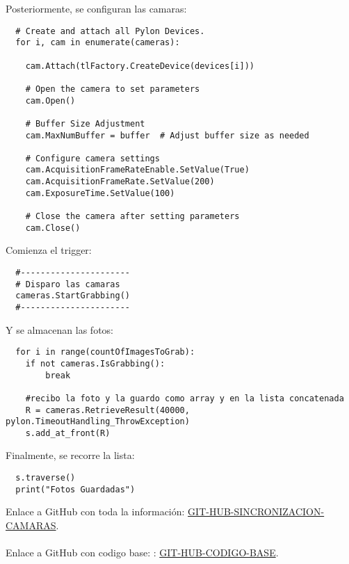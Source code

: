 \documentclass{article}
\begin{document}
Posteriormente, se configuran las camaras:

\begin{lstlisting}
  # Create and attach all Pylon Devices.
  for i, cam in enumerate(cameras):
      
    cam.Attach(tlFactory.CreateDevice(devices[i]))

    # Open the camera to set parameters
    cam.Open()

    # Buffer Size Adjustment
    cam.MaxNumBuffer = buffer  # Adjust buffer size as needed
    
    # Configure camera settings
    cam.AcquisitionFrameRateEnable.SetValue(True)
    cam.AcquisitionFrameRate.SetValue(200)
    cam.ExposureTime.SetValue(100) 

    # Close the camera after setting parameters
    cam.Close()
\end{lstlisting}

Comienza el trigger:

\begin{lstlisting}
  #----------------------
  # Disparo las camaras
  cameras.StartGrabbing()
  #----------------------
\end{lstlisting}

Y se almacenan las fotos:

\begin{lstlisting}
  for i in range(countOfImagesToGrab):
    if not cameras.IsGrabbing():
        break

    #recibo la foto y la guardo como array y en la lista concatenada
    R = cameras.RetrieveResult(40000, pylon.TimeoutHandling_ThrowException)
    s.add_at_front(R)
\end{lstlisting}

Finalmente, se recorre la lista:

\begin{lstlisting}
  s.traverse()
  print("Fotos Guardadas")
\end{lstlisting}


























\noindent Enlace a GitHub con toda la información: \href{https://github.com/LukasWolff2002/SINCRONIZACION_CAMARAS_BASLER}{GIT-HUB-SINCRONIZACION-CAMARAS}.
\\ \\
\noindent Enlace a GitHub con codigo base: : \href{https://github.com/basler/pypylon/blob/master/samples/grabmultiplecameras.py}{GIT-HUB-CODIGO-BASE}.
\end{document}

